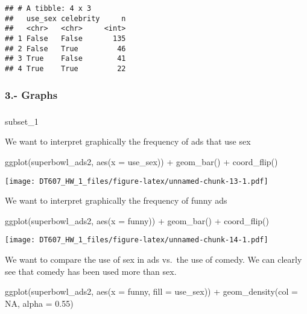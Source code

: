 \documentclass[
]{article}
\newenvironment{Shaded}{\begin{snugshade}}{\end{snugshade}}
\newcommand{\AttributeTok}[1]{\textcolor[rgb]{0.77,0.63,0.00}{#1}}
\newcommand{\ConstantTok}[1]{\textcolor[rgb]{0.00,0.00,0.00}{#1}}
\newcommand{\FloatTok}[1]{\textcolor[rgb]{0.00,0.00,0.81}{#1}}
\newcommand{\FunctionTok}[1]{\textcolor[rgb]{0.00,0.00,0.00}{#1}}
\newcommand{\NormalTok}[1]{#1}
\newcommand{\SpecialCharTok}[1]{\textcolor[rgb]{0.00,0.00,0.00}{#1}}
\begin{document}
\begin{verbatim}
## # A tibble: 4 x 3
##   use_sex celebrity     n
##   <chr>   <chr>     <int>
## 1 False   False       135
## 2 False   True         46
## 3 True    False        41
## 4 True    True         22
\end{verbatim}

\hypertarget{graphs}{%
\subsubsection{3.- Graphs}\label{graphs}}

\hypertarget{section-3}{%
\subparagraph{}\label{section-3}}

subset\_1

We want to interpret graphically the frequency of ads that use sex

\begin{Shaded}
\begin{Highlighting}[]
\FunctionTok{ggplot}\NormalTok{(superbowl\_ads2, }\FunctionTok{aes}\NormalTok{(}\AttributeTok{x =}\NormalTok{ use\_sex)) }\SpecialCharTok{+} 
  \FunctionTok{geom\_bar}\NormalTok{() }\SpecialCharTok{+}
  \FunctionTok{coord\_flip}\NormalTok{()}
\end{Highlighting}
\end{Shaded}

\texttt{[image: DT607\_HW\_1\_files/figure-latex/unnamed-chunk-13-1.pdf]}

We want to interpret graphically the frequency of funny ads

\begin{Shaded}
\begin{Highlighting}[]
\FunctionTok{ggplot}\NormalTok{(superbowl\_ads2, }\FunctionTok{aes}\NormalTok{(}\AttributeTok{x =}\NormalTok{ funny)) }\SpecialCharTok{+} 
  \FunctionTok{geom\_bar}\NormalTok{() }\SpecialCharTok{+}
  \FunctionTok{coord\_flip}\NormalTok{()}
\end{Highlighting}
\end{Shaded}

\texttt{[image: DT607\_HW\_1\_files/figure-latex/unnamed-chunk-14-1.pdf]}

We want to compare the use of sex in ads vs.~the use of comedy. We can
clearly see that comedy has been used more than sex.

\begin{Shaded}
\begin{Highlighting}[]
\FunctionTok{ggplot}\NormalTok{(superbowl\_ads2, }\FunctionTok{aes}\NormalTok{(}\AttributeTok{x =}\NormalTok{ funny, }\AttributeTok{fill =}\NormalTok{ use\_sex)) }\SpecialCharTok{+} 
  \FunctionTok{geom\_density}\NormalTok{(}\AttributeTok{col =} \ConstantTok{NA}\NormalTok{, }\AttributeTok{alpha =} \FloatTok{0.55}\NormalTok{)}
\end{Highlighting}
\end{Shaded}
\end{document}

